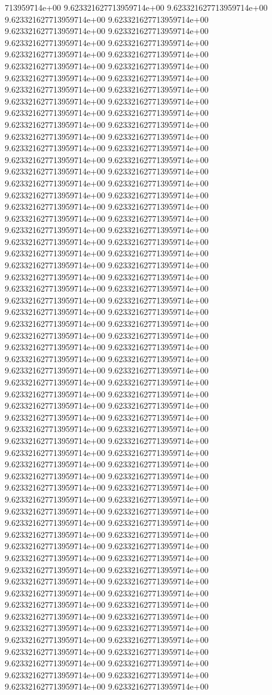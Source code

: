 713959714e+00	9.623321627713959714e+00	9.623321627713959714e+00	9.623321627713959714e+00	9.623321627713959714e+00	9.623321627713959714e+00	9.623321627713959714e+00	9.623321627713959714e+00	9.623321627713959714e+00	9.623321627713959714e+00	9.623321627713959714e+00	9.623321627713959714e+00	9.623321627713959714e+00	9.623321627713959714e+00	9.623321627713959714e+00	9.623321627713959714e+00	9.623321627713959714e+00	9.623321627713959714e+00	9.623321627713959714e+00	9.623321627713959714e+00	9.623321627713959714e+00	9.623321627713959714e+00	9.623321627713959714e+00	9.623321627713959714e+00	9.623321627713959714e+00	9.623321627713959714e+00	9.623321627713959714e+00	9.623321627713959714e+00	9.623321627713959714e+00	9.623321627713959714e+00	9.623321627713959714e+00	9.623321627713959714e+00	9.623321627713959714e+00	9.623321627713959714e+00	9.623321627713959714e+00	9.623321627713959714e+00	9.623321627713959714e+00	9.623321627713959714e+00	9.623321627713959714e+00	9.623321627713959714e+00	9.623321627713959714e+00	9.623321627713959714e+00	9.623321627713959714e+00	9.623321627713959714e+00	9.623321627713959714e+00	9.623321627713959714e+00	9.623321627713959714e+00	9.623321627713959714e+00	9.623321627713959714e+00	9.623321627713959714e+00	9.623321627713959714e+00	9.623321627713959714e+00	9.623321627713959714e+00	9.623321627713959714e+00	9.623321627713959714e+00	9.623321627713959714e+00	9.623321627713959714e+00	9.623321627713959714e+00	9.623321627713959714e+00	9.623321627713959714e+00	9.623321627713959714e+00	9.623321627713959714e+00	9.623321627713959714e+00	9.623321627713959714e+00	9.623321627713959714e+00	9.623321627713959714e+00	9.623321627713959714e+00	9.623321627713959714e+00	9.623321627713959714e+00	9.623321627713959714e+00	9.623321627713959714e+00	9.623321627713959714e+00	9.623321627713959714e+00	9.623321627713959714e+00	9.623321627713959714e+00	9.623321627713959714e+00	9.623321627713959714e+00	9.623321627713959714e+00	9.623321627713959714e+00	9.623321627713959714e+00	9.623321627713959714e+00	9.623321627713959714e+00	9.623321627713959714e+00	9.623321627713959714e+00	9.623321627713959714e+00	9.623321627713959714e+00	9.623321627713959714e+00	9.623321627713959714e+00	9.623321627713959714e+00	9.623321627713959714e+00	9.623321627713959714e+00	9.623321627713959714e+00	9.623321627713959714e+00	9.623321627713959714e+00	9.623321627713959714e+00	9.623321627713959714e+00	9.623321627713959714e+00	9.623321627713959714e+00	9.623321627713959714e+00	9.623321627713959714e+00	9.623321627713959714e+00	9.623321627713959714e+00	9.623321627713959714e+00	9.623321627713959714e+00	9.623321627713959714e+00	9.623321627713959714e+00	9.623321627713959714e+00	9.623321627713959714e+00	9.623321627713959714e+00	9.623321627713959714e+00	9.623321627713959714e+00	9.623321627713959714e+00	9.623321627713959714e+00	9.623321627713959714e+00	9.623321627713959714e+00	9.623321627713959714e+00	9.623321627713959714e+00	9.623321627713959714e+00	9.623321627713959714e+00
